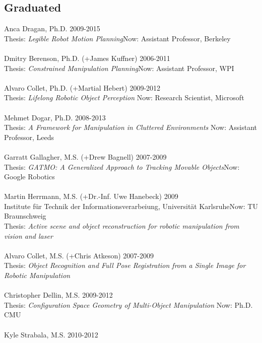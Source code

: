 \subsection{Graduated}
\noindent
Anca Dragan, Ph.D. \hfill 2009-2015\\
Thesis: \textit{Legible Robot Motion Planning}\hfill Now: Assistant Professor, Berkeley\\
\\
Dmitry Berenson, Ph.D. (+James Kuffner) \hfill 2006-2011\\
Thesis: \textit{Constrained Manipulation Planning}\hfill Now: Assistant Professor, WPI\\
\\
Alvaro Collet, Ph.D. (+Martial Hebert) \hfill 2009-2012\\
Thesis: \textit{Lifelong Robotic Object Perception} \hfill Now: Research Scientist, Microsoft\\
\\
Mehmet Dogar, Ph.D. \hfill 2008-2013\\
Thesis: \textit{A Framework for Manipulation in Cluttered Environments} \hfill Now: Assistant Professor, Leeds\\
\\
Garratt Gallagher, M.S. (+Drew Bagnell) \hfill 2007-2009\\ 
Thesis: \textit{GATMO: A Generalized Approach to Tracking Movable Objects}\hfill Now: Google Robotics\\
\\
Martin Herrmann, M.S. (+Dr.-Inf. Uwe Hanebeck) \hfill 2009\\
Institute f\"ur Technik der Informationsverarbeiung, Universit\"at Karlsruhe\hfill Now: TU Braunschweig\\
Thesis: \textit{Active scene and object reconstruction for robotic manipulation from vision and laser}\\
\\
Alvaro Collet, M.S. (+Chris Atkeson) \hfill 2007-2009\\
Thesis: \textit{Object Recognition and Full Pose Registration from a Single Image for Robotic Manipulation}\\
\\
Christopher Dellin, M.S. \hfill 2009-2012\\
Thesis: \textit{Configuration Space Geometry of Multi-Object Manipulation} \hfill Now: Ph.D. CMU\\
\\
Kyle Strabala, M.S. \hfill 2010-2012\\
